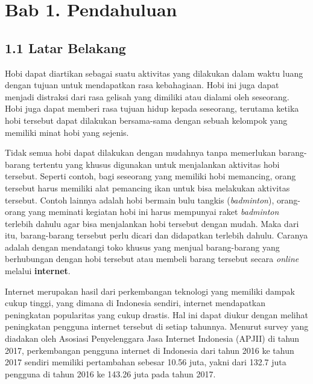 \documentclass[a4paper]{article}
\begin{document}
\newpage
\section*{Bab 1. Pendahuluan}

\subsection*{1.1 Latar Belakang}

Hobi dapat diartikan sebagai suatu aktivitas yang dilakukan dalam waktu luang dengan tujuan untuk mendapatkan rasa kebahagiaan. Hobi ini juga dapat menjadi distraksi dari rasa gelisah yang dimiliki atau dialami oleh seseorang. Hobi juga dapat memberi rasa tujuan hidup kepada seseorang, terutama ketika hobi tersebut dapat dilakukan bersama-sama dengan sebuah kelompok yang memiliki minat hobi yang sejenis\autocite{zaidi2022passion}.


Tidak semua hobi dapat dilakukan dengan mudahnya tanpa memerlukan barang-barang tertentu yang khusus digunakan untuk menjalankan aktivitas hobi tersebut. Seperti contoh, bagi seseorang yang memiliki hobi memancing, orang tersebut harus memiliki alat pemancing ikan untuk bisa melakukan aktivitas tersebut. Contoh lainnya adalah hobi bermain bulu tangkis (\textit{badminton}), orang-orang yang meminati kegiatan hobi ini harus mempunyai raket \textit{badminton} terlebih dahulu agar bisa menjalankan hobi tersebut dengan mudah. Maka dari itu, barang-barang tersebut perlu dicari dan didapatkan terlebih dahulu. Caranya adalah dengan mendatangi toko khusus yang menjual barang-barang yang berhubungan dengan hobi tersebut atau membeli barang tersebut secara \textit{online} melalui \textbf{internet}.


Internet merupakan hasil dari perkembangan teknologi yang memiliki dampak cukup tinggi, yang dimana di Indonesia sendiri, internet mendapatkan peningkatan popularitas yang cukup drastis. Hal ini dapat diukur dengan melihat peningkatan pengguna internet tersebut di setiap tahunnya. Menurut survey yang diadakan oleh Asosiasi Penyelenggara Jasa Internet Indonesia (APJII) di tahun 2017, perkembangan pengguna internet di Indonesia dari tahun 2016 ke tahun 2017 sendiri memiliki pertambahan sebesar 10.56 juta, yakni dari 132.7 juta pengguna di tahun 2016 ke 143.26 juta pada tahun 2017\autocite{indonesia2017infografis}.
\end{document}
